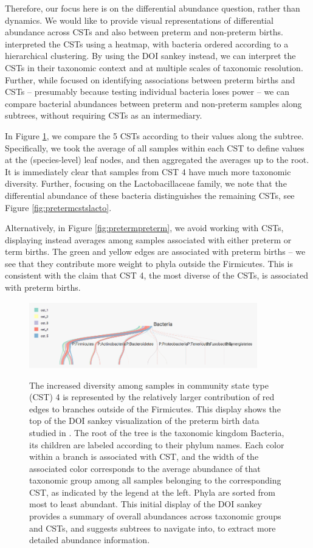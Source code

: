 \documentclass{report}
\begin{document}
Therefore, our focus here is on the differential abundance question,
rather than dynamics. We would like to provide visual representations of
differential abundance across CSTs and also between preterm and non-preterm
births. \citet{digiulio2015temporal} interpreted the CSTs using a heatmap, with
bacteria ordered according to a hierarchical clustering. By using the DOI sankey
instead, we can interpret the CSTs in their taxonomic context and at multiple
scales of taxonomic resolution. Further, while
\citet{digiulio2015temporal} focused on identifying associations between
preterm births and CSTs -- presumably because testing individual bacteria loses
power -- we can compare bacterial abundances between preterm and non-preterm
samples along subtrees, without requiring CSTs as an intermediary.

In Figure \ref{fig:pretermcsts}, we compare the 5 CSTs according to
their values along the subtree. Specifically, we took the average of all
samples within each CST to define values at the (species-level) leaf
nodes, and then aggregated the averages up to the root. It is
immediately clear that samples from CST 4 have much more taxonomic
diversity. Further, focusing on the Lactobacillaceae family, we note
that the differential abundance of these bacteria distinguishes the
remaining CSTs, see Figure \ref{fig:pretermcstslacto}.

Alternatively, in Figure \ref{fig:pretermpreterm}, we avoid working with CSTs,
displaying instead averages among samples associated with either preterm or term
births. The green and yellow edges are associated with preterm births -- we see
that they contribute more weight to phyla outside the Firmicutes. This is
consistent with the claim that CST 4, the most diverse of the CSTs, is
associated with preterm births.

\begin{figure}
{\centering \includegraphics[width=375px]{figure/treelapse/preterm_csts}}
\caption{The increased diversity among samples in community state type (CST) 4
  is represented by the relatively larger contribution of red edges to branches
  outside of the Firmicutes. This display shows the top of the DOI sankey
  visualization of the preterm birth data studied in
  \citep{digiulio2015temporal}. The root of the tree is the taxonomic kingdom
  Bacteria, its children are labeled according to their phylum names. Each color
  within a branch is associated with CST, and the width of the associated color
  corresponds to the average abundance of that taxonomic group among all samples
  belonging to the corresponding CST, as indicated by the legend at the left.
  Phyla are sorted from most to least abundant. This initial display of the DOI
  sankey provides a summary of overall abundances across taxonomic groups and
  CSTs, and suggests subtrees to navigate into, to extract more detailed
  abundance information.
}\label{fig:pretermcsts}
\end{figure}
\end{document}
